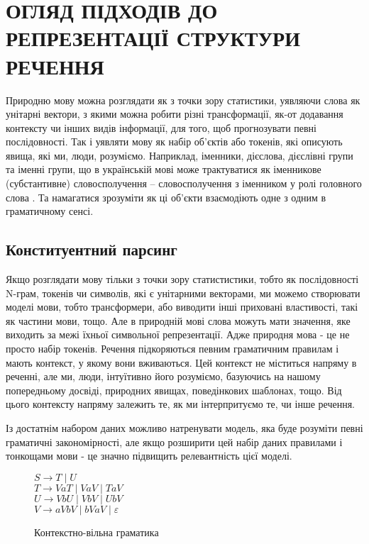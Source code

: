 \section{ОГЛЯД ПІДХОДІВ ДО РЕПРЕЗЕНТАЦІЇ СТРУКТУРИ РЕЧЕННЯ}
Природню мову можна розглядати як з точки зору статистики, уявляючи слова як унітарні вектори,
з якими можна робити різні трансформації, як-от додавання контексту чи інших видів
інформації, для того, щоб прогнозувати певні послідовності. Так і уявляти мову як
набір об'єктів або токенів, які описують явища, які ми, люди, розуміємо. Наприклад,
іменники, дієслова, дієслівні групи та іменні групи, що в українській мові
може трактуватися як іменникове (субстантивне) словосполучення – словосполучення 
з іменником у ролі головного слова \cite{bib3}. Та намагатися зрозуміти як
ці об'єкти взаємодіють одне з одним в граматичному сенсі.

\subsection{Конституентний парсинг}
Якщо розглядати мову тільки з точки зору статистистики, тобто як послідовності N-грам, токенів
чи символів, які є унітарними векторами, ми можемо створювати моделі мови, тобто трансформери,
або виводити інші приховані властивості, такі як частини мови, тощо. Але в природній мові слова
можуть мати значення, яке виходить за межі їхньої символьної репрезентації. Адже природня
мова - це не просто набір токенів. Речення підкоряються певним граматичним правилам і мають
контекст, у якому вони вживаються. Цей контекст не міститься напряму в реченні, але ми, люди,
інтуїтивно його розуміємо, базуючись на нашому попередньому досвіді, природних явищах, поведінкових
шаблонах, тощо. Від цього контексту напряму залежить те, як ми інтерпритуємо те, чи інше речення.

Із достатнім набором даних можливо натренувати модель, яка буде розуміти певні граматичні
закономірності, але якщо розширити цей набір даних правилами і тонкощами мови - це значно
підвищить релевантність цієї моделі.

\begin{wrapfigure}{r}{0.35\textwidth}
  \begin{center}
    \noindent $S \rightarrow T \mid U$ \\
    \noindent $T \rightarrow VaT \mid VaV \mid TaV$ \\
    \noindent $U \rightarrow VbU \mid VbV \mid UbV$ \\
    \noindent $V \rightarrow aVbV \mid bVaV \mid \varepsilon$ \\
  \end{center}
  \caption{Контекстно-вільна граматика}
  \label{text:context_free_grammar}
\end{wrapfigure}

